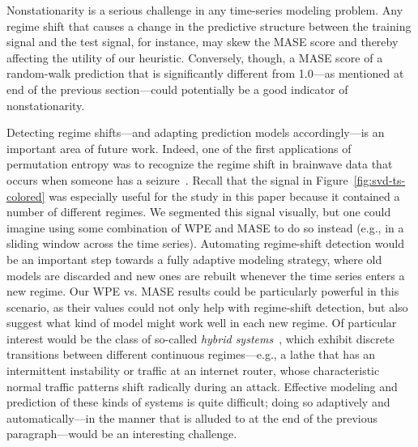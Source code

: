 
Nonstationarity is a serious challenge in any time-series modeling
problem.  Any regime shift that causes a change in the predictive
structure between the training signal and the test signal, for
instance, may skew the MASE score and thereby affecting the utility of
our heuristic.  Conversely, though, a MASE score of a random-walk
prediction that is significantly different from 1.0---as mentioned at
end of the previous section---could potentially be a good indicator of
nonstationarity.

Detecting regime shifts---and adapting prediction models
accordingly---is an important area of future work.  Indeed, one of the
first applications of permutation entropy was to recognize the regime
shift in brainwave data that occurs when someone has a
seizure~\cite{cao2004det}.  Recall that the signal in
Figure~\ref{fig:svd-ts-colored} was especially useful for the study in
this paper because it contained a number of different regimes.  We
segmented this signal visually, but one could imagine using some
combination of WPE and MASE to do so instead (e.g., in a sliding
window across the time series).  Automating regime-shift detection
would be an important step towards a fully adaptive modeling strategy,
where old models are discarded and new ones are rebuilt whenever the
time series enters a new regime.  Our WPE vs. MASE results could be
particularly powerful in this scenario, as their values could not only
help with regime-shift detection, but also suggest what kind of model
might work well in each new regime.  Of particular interest would be
the class of so-called \emph{hybrid systems}~\cite{hybrid}, which
exhibit discrete transitions between different continuous
regimes---e.g., a lathe that has an intermittent instability or
traffic at an internet router, whose characteristic normal traffic
patterns shift radically during an attack.  Effective modeling and
prediction of these kinds of systems is quite difficult; doing so
adaptively and automatically---in the manner that is alluded to at the
end of the previous paragraph---would be an interesting challenge.


